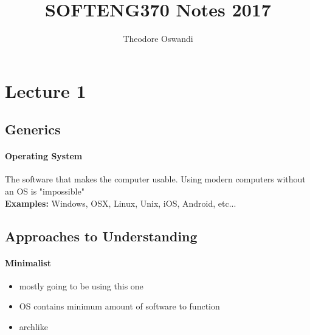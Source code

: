 \documentclass{article}
\title{SOFTENG370 Notes 2017}
\author{Theodore Oswandi}
\newcommand\tab[1][0.5cm]{\hspace*{#1}}
\begin{document}
 \maketitle{} 

\section{Lecture 1}
	\subsection{Generics}
		\paragraph{\tab Operating System} The software that makes the computer usable. Using modern computers without an OS is "impossible"
			\\ \tab \textbf{Examples: }Windows, OSX, Linux, Unix, iOS, Android, etc...


	\subsection{Approaches to Understanding}
		\paragraph{\tab Minimalist}
		\begin{itemize}
			\item mostly going to be using this one
			\item OS contains minimum amount of software to function
			\item archlike
		\end{itemize}
\end{document}
